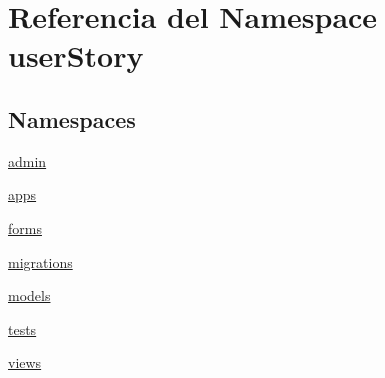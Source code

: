 \hypertarget{namespaceuser_story}{}\section{Referencia del Namespace user\+Story}
\label{namespaceuser_story}
\subsection*{Namespaces}
\begin{DoxyCompactItemize}
\item 
 \hyperlink{namespaceuser_story_1_1admin}{admin}
\item 
 \hyperlink{namespaceuser_story_1_1apps}{apps}
\item 
 \hyperlink{namespaceuser_story_1_1forms}{forms}
\item 
 \hyperlink{namespaceuser_story_1_1migrations}{migrations}
\item 
 \hyperlink{namespaceuser_story_1_1models}{models}
\item 
 \hyperlink{namespaceuser_story_1_1tests}{tests}
\item 
 \hyperlink{namespaceuser_story_1_1views}{views}
\end{DoxyCompactItemize}

